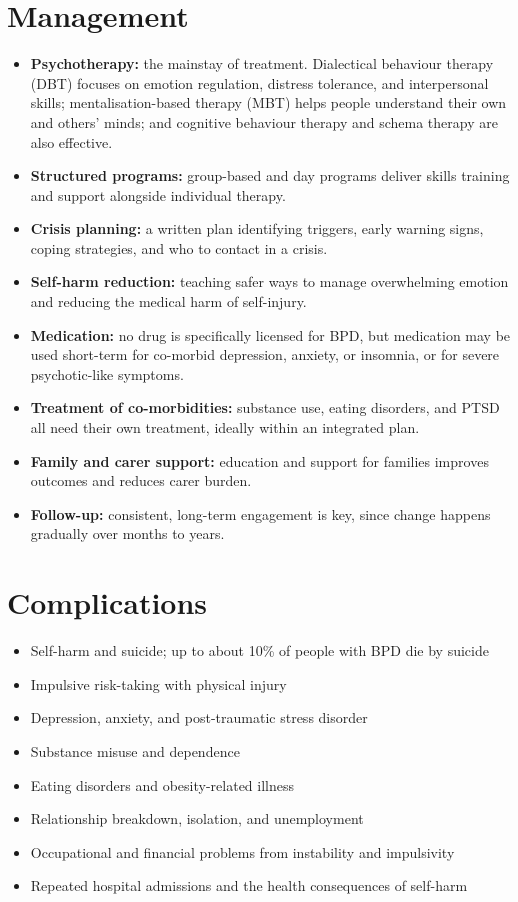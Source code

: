 \section*{Management}
\begin{itemize}
    \item \textbf{Psychotherapy:} the mainstay of treatment. Dialectical behaviour therapy (DBT) focuses on emotion regulation, distress tolerance, and interpersonal skills; mentalisation-based therapy (MBT) helps people understand their own and others' minds; and cognitive behaviour therapy and schema therapy are also effective.
    \item \textbf{Structured programs:} group-based and day programs deliver skills training and support alongside individual therapy.
    \item \textbf{Crisis planning:} a written plan identifying triggers, early warning signs, coping strategies, and who to contact in a crisis.
    \item \textbf{Self-harm reduction:} teaching safer ways to manage overwhelming emotion and reducing the medical harm of self-injury.
    \item \textbf{Medication:} no drug is specifically licensed for BPD, but medication may be used short-term for co-morbid depression, anxiety, or insomnia, or for severe psychotic-like symptoms.
    \item \textbf{Treatment of co-morbidities:} substance use, eating disorders, and PTSD all need their own treatment, ideally within an integrated plan.
    \item \textbf{Family and carer support:} education and support for families improves outcomes and reduces carer burden.
    \item \textbf{Follow-up:} consistent, long-term engagement is key, since change happens gradually over months to years.
\end{itemize}

\section*{Complications}
\begin{itemize}
    \item Self-harm and suicide; up to about 10\% of people with BPD die by suicide
    \item Impulsive risk-taking with physical injury
    \item Depression, anxiety, and post-traumatic stress disorder
    \item Substance misuse and dependence
    \item Eating disorders and obesity-related illness
    \item Relationship breakdown, isolation, and unemployment
    \item Occupational and financial problems from instability and impulsivity
    \item Repeated hospital admissions and the health consequences of self-harm
\end{itemize}

